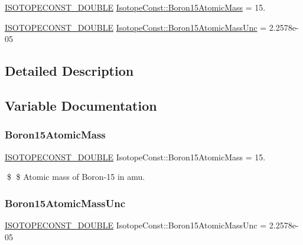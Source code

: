 \begin{DoxyCompactItemize}
\item 
\mbox{\hyperlink{group___isotope_const-_macros_ga8f45a7272ce02c0b4c65c44636ed719a}{I\+S\+O\+T\+O\+P\+E\+C\+O\+N\+S\+T\+\_\+\+D\+O\+U\+B\+LE}} \mbox{\hyperlink{group___isotope_const-_boron-_b15_ga0d48a26a543432f4d89b9b9ba4e1d426}{Isotope\+Const\+::\+Boron15\+Atomic\+Mass}} = 15.
\item 
\mbox{\hyperlink{group___isotope_const-_macros_ga8f45a7272ce02c0b4c65c44636ed719a}{I\+S\+O\+T\+O\+P\+E\+C\+O\+N\+S\+T\+\_\+\+D\+O\+U\+B\+LE}} \mbox{\hyperlink{group___isotope_const-_boron-_b15_ga5c0ffc24ba3b16f1d366f65cd6603f11}{Isotope\+Const\+::\+Boron15\+Atomic\+Mass\+Unc}} = 2.\+2578e-\/05
\end{DoxyCompactItemize}


\subsection{Detailed Description}


\subsection{Variable Documentation}
\mbox{\label{group___isotope_const-_boron-_b15_ga0d48a26a543432f4d89b9b9ba4e1d426}} 
\subsubsection{\texorpdfstring{Boron15\+Atomic\+Mass}{Boron15AtomicMass}}
{\footnotesize\ttfamily \mbox{\hyperlink{group___isotope_const-_macros_ga8f45a7272ce02c0b4c65c44636ed719a}{I\+S\+O\+T\+O\+P\+E\+C\+O\+N\+S\+T\+\_\+\+D\+O\+U\+B\+LE}} Isotope\+Const\+::\+Boron15\+Atomic\+Mass = 15.}

\$ \$ Atomic mass of Boron-\/15 in amu. \mbox{\label{group___isotope_const-_boron-_b15_ga5c0ffc24ba3b16f1d366f65cd6603f11}} 
\subsubsection{\texorpdfstring{Boron15\+Atomic\+Mass\+Unc}{Boron15AtomicMassUnc}}
{\footnotesize\ttfamily \mbox{\hyperlink{group___isotope_const-_macros_ga8f45a7272ce02c0b4c65c44636ed719a}{I\+S\+O\+T\+O\+P\+E\+C\+O\+N\+S\+T\+\_\+\+D\+O\+U\+B\+LE}} Isotope\+Const\+::\+Boron15\+Atomic\+Mass\+Unc = 2.\+2578e-\/05}

